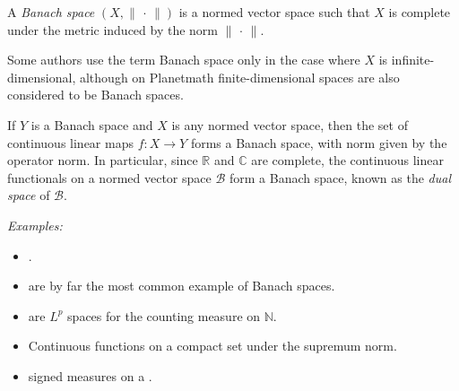 \documentclass{article}
\newcommand{\norm}[1]{\lVert #1 \rVert}
\begin{document}

A \emph{Banach space} $(X,\norm{\,\cdot\,})$ is a normed vector space such that $X$ is complete under the metric induced by the norm $\norm{\,\cdot\,}$.

Some authors use the term Banach space only in the case where $X$ is infinite-dimensional, although on Planetmath finite-dimensional spaces are also considered to be Banach spaces.

If $Y$ is a Banach space and $X$ is any normed vector space, then the set of continuous linear maps $f\colon X\to Y$ forms a Banach space, with norm given by the operator norm.  In particular, since $\mathbb{R}$ and $\mathbb{C}$ are complete, the continuous linear functionals on a normed vector space $\mathcal{B}$ form a Banach space, known as the \emph{dual space} of $\mathcal{B}$.

\emph{Examples:}
\begin{itemize}
\item {}.
\item {} are by far the most common example of Banach spaces.
\item {} are $L^p$ spaces for the counting measure on $\mathbb{N}$.
\item Continuous functions on a compact set under the supremum norm.
\item {} signed measures on a .
\end{itemize}
\end{document}
